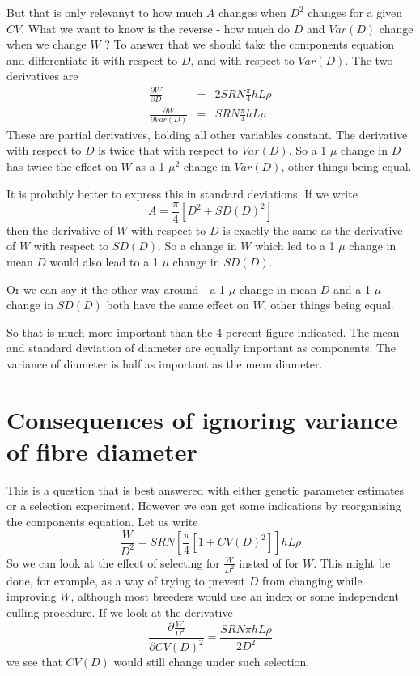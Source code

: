 \documentclass[titlepage]{article}  %
\begin{document}
But that is only relevanyt to how much $A$ changes when $D^{2}$ changes for a given $CV$. What we want to know is the reverse - how much do $D$ and $Var{(D)}$ change when we change $W$ ? To answer that we should take the components equation and differentiate it with respect to $D$, and with respect to $Var{(D)}$. The two derivatives are 
\begin{eqnarray*}
\frac{\partial W}{\partial D} & = & 2 S R N \frac{\pi}{4} h L \rho \\
\frac{\partial W}{\partial Var{(D)}} & = & S R N \frac{\pi}{4} h L \rho
\end{eqnarray*}
These are partial derivatives, holding all other variables constant. 
The derivative with respect to $D$ is twice that with respect to $Var{(D)}$. So a 1 $\mu$ change in $D$ has twice the effect on $W$ as a 1 $\mu^{2}$ change in $Var{(D)}$, other things being equal.

It is probably better to express this in standard deviations. If we write 
\begin{displaymath}
A = \frac{\pi}{4}[D^{2} + SD{(D)}^{2}]
\end{displaymath}
then the derivative of $W$ with respect to $D$ is exactly the same as the derivative of $W$ with respect to $SD{(D)}$. So a change in $W$ which led to a 1 $\mu$ change in mean $D$ would also lead to a 1 $\mu$ change in $SD{(D)}$. 

Or we can say it the other way around - a 1 $\mu$ change in mean $D$ and a 1 $\mu$ change in $SD{(D)}$ both have the same effect on $W$, other things being equal.

So that is much more important than the 4 percent figure indicated. The mean and standard deviation of diameter are equally important as components. The variance of diameter is half as important as the mean diameter.


\section{Consequences of ignoring variance of fibre diameter}
This is a question that is best answered with either genetic parameter estimates or a selection experiment. However we can get some indications by reorganising the components equation.  Let us write
\begin{displaymath}
\frac{W}{D^{2}} = S R N \left[ \frac{\pi}{4} [ 1 + CV(D)^{2}] \right] hL \rho
\end{displaymath}
So we can look at the effect of selecting for $\frac{W}{D^{2}}$ insted of for $W$. This might be done, for example, as a way of trying to prevent $D$ from changing while improving $W$, although most breeders would use an index or some independent culling procedure. If we look at the derivative
\begin{displaymath}
\frac{\partial \frac{W}{D^{2}}}{\partial CV(D)^{2}} = \frac{S R N \pi h L \rho}{2 D^{2}}
\end{displaymath}
we see that $CV(D)$ would still change under such selection.
\end{document}
